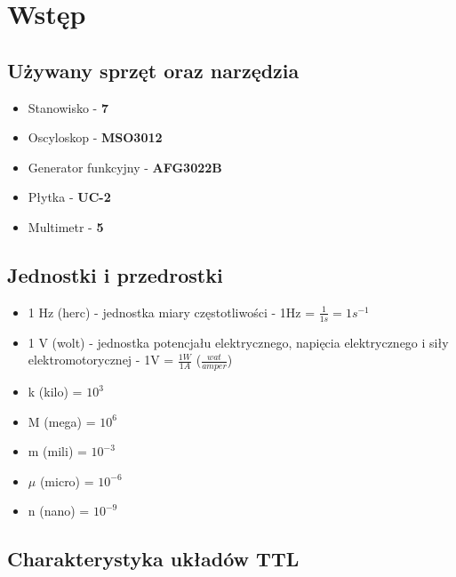 \chapter{Wstęp}

\section{Używany sprzęt oraz narzędzia}

\begin{itemize}
    \item Stanowisko - \textbf{7}
    \item Oscyloskop - \textbf{MSO3012}
    \item Generator funkcyjny - \textbf{AFG3022B}
    \item Płytka - \textbf{UC-2}
    \item Multimetr - \textbf{5}
\end{itemize}

\section{Jednostki i przedrostki}

\begin{itemize}
    \item 1 Hz (herc) - jednostka miary częstotliwości - 1Hz = $\frac{1}{1s} = 1s^{-1}$
    \item 1 V (wolt) - jednostka potencjału elektrycznego, napięcia elektrycznego i siły elektromotorycznej - 1V = $\frac{1W}{1A}$ ($\frac{wat}{amper}$)
\end{itemize}

\begin{itemize}
    \item k (kilo) = $10^3$
    \item M (mega) = $10^6$
    \item m (mili) = $10^{-3}$
    \item $\mu$ (micro) = $10^{-6}$
    \item n (nano) = $10^{-9}$
\end{itemize}

\section{Charakterystyka układów TTL}
\label{TTL:charakterystyka}

